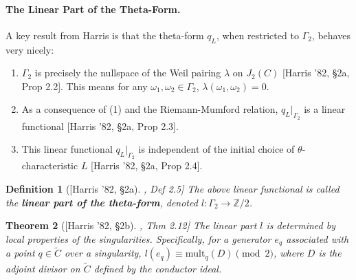 \documentclass[11pt,a4paper]{article}
\newcommand{\ZZ}{\mathbb{Z}}
\theoremstyle{mytheoremstyle}
\newtheorem{theorem}{Theorem}[section]
\theoremstyle{mydefinitionstyle}
\newtheorem{definition}[theorem]{Definition}
\newcommand{\HarrisThetaCite}[1]{[Harris '82, \S#1]}
\begin{document}
\paragraph{The Linear Part of the Theta-Form.}
A key result from Harris is that the theta-form $q_L$, when restricted to $\Gamma_2$, behaves very nicely:
\begin{enumerate}
    \item $\Gamma_2$ is precisely the nullspace of the Weil pairing $\lambda$ on $J_2(C)$ \HarrisThetaCite{2a, Prop 2.2}. This means for any $\omega_1, \omega_2 \in \Gamma_2$, $\lambda(\omega_1, \omega_2) = 0$.
    \item As a consequence of (1) and the Riemann-Mumford relation, $q_L|_{\Gamma_2}$ is a linear functional \HarrisThetaCite{2a, Prop 2.3}.
    \item This linear functional $q_L|_{\Gamma_2}$ is independent of the initial choice of $\theta$-characteristic $L$ \HarrisThetaCite{2a, Prop 2.4}.
\end{enumerate}
\begin{definition}[\HarrisThetaCite{2a}, Def 2.5]
The above linear functional is called the \textbf{linear part of the theta-form}, denoted $l: \Gamma_2 \to \ZZ/2$.
\end{definition}
\begin{theorem}[\HarrisThetaCite{2b}, Thm 2.12]
The linear part $l$ is determined by local properties of the singularities. Specifically, for a generator $e_q$ associated with a point $q \in \widetilde{C}$ over a singularity, $l(e_q) \equiv \text{mult}_q(D) \pmod 2$, where $D$ is the adjoint divisor on $\widetilde{C}$ defined by the conductor ideal.
\end{theorem}
\end{document}
